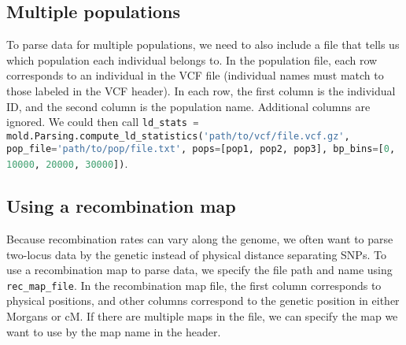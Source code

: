 \documentclass[10pt]{article}
\makeatletter
\newcommand{\py}[1]{\lstinline[breaklines=true,language=Python, showstringspaces=False]@#1@}
\makeatother
\begin{document}
\subsection{Multiple populations}

To parse data for multiple populations, we need to also include a file that tells us which population each individual belongs to.
In the population file, each row corresponds to an individual in the VCF file (individual names must match to those labeled in the VCF header).
In each row, the first column is the individual ID, and the second column is the population name.
Additional columns are ignored.
We could then call \py{ld_stats = mold.Parsing.compute_ld_statistics('path/to/vcf/file.vcf.gz', pop_file='path/to/pop/file.txt', pops=[pop1, pop2, pop3], bp_bins=[0, 10000, 20000, 30000])}.

\subsection{Using a recombination map}

Because recombination rates can vary along the genome, we often want to parse two-locus data by the genetic instead of physical distance separating SNPs.
To use a recombination map to parse data, we specify the file path and name using \py{rec_map_file}.
In the recombination map file, the first column corresponds to physical positions, and other columns correspond to the genetic position in either Morgans or cM.
If there are multiple maps in the file, we can specify the map we want to use by the map name in the header.
\end{document}
